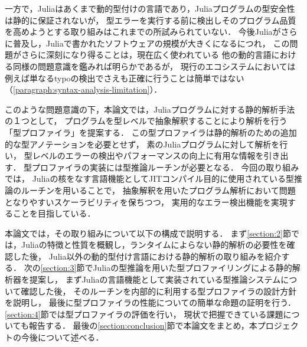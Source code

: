 一方で，Juliaはあくまで動的型付けの言語であり，Juliaプログラムの型安全性は静的に保証されないが，
型エラーを実行する前に検出しそのプログラム品質を高めようとする取り組みはこれまでの所試みられていない．
今後Juliaがさらに普及し，Juliaで書かれたソフトウェアの規模が大きくになるにつれ，
この問題がさらに深刻になり得ることは，現在広く使われている
他の動的言語における同様の問題意識を鑑みれば明らかであるが\cite{ruby-progress-report}，
現行のエコシステムにおいては例えば単なるtypoの検出でさえも正確に行うことは簡単ではない（\ref{paragraph:syntax-analysis-limitation}）．

このような問題意識の下，本論文では，Juliaプログラムに対する静的解析手法の１つとして，
プログラムを型レベルで抽象解釈することにより解析を行う「型プロファイラ」を提案する．
この型プロファイラは静的解析のための追加的な型アノテーションを必要とせず，
素のJuliaプログラムに対して解析を行い，
型レベルのエラーの検出やパフォーマンスの向上に有用な情報を引き出す．
型プロファイラの実装には型推論ルーチンが必要となる．
今回の取り組みでは，
Juliaの核をなす言語機能としてJITコンパイル目的に使用されている型推論のルーチンを用いることで，
抽象解釈を用いたプログラム解析において問題となりやすいスケーラビリティを保ちつつ，
実用的なエラー検出機能を実現することを目指している．

本論文では，その取り組みについて以下の構成で説明する．
まず\ref{section:2}節では，Juliaの特徴と性質を概観し，ランタイムによらない静的解析の必要性を確認した後，
Julia以外の動的型付け言語における静的解析の取り組みを紹介する．
次の\ref{section:3}節でJuliaの型推論を用いた型プロファイリングによる静的解析器を提案し，
まずJuliaの言語機能として実装されている型推論システムについて確認した後，
そのルーチンを内部的に利用する型プロファイラの設計方針を説明し，
最後に型プロファイラの性能についての簡単な命題の証明を行う． %
\ref{section:4}節では型プロファイラの評価を行い，
現状で把握できている課題についても報告する．
最後の\ref{section:conclusion}節で本論文をまとめ，本プロジェクトの今後について述べる．
